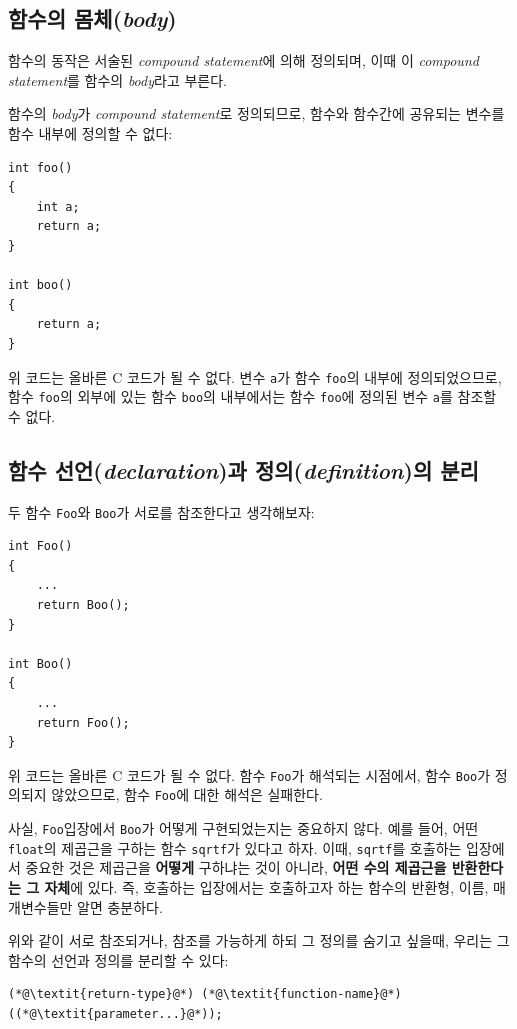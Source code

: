\documentclass[a4paper,12pt]{book}
\newcommand{\V}[1]{\Verb|#1|}
\begin{document}
\subsection{함수의 몸체(\textit{body})}

함수의 동작은 서술된 \textit{compound statement}에 의해 정의되며,
이때 이 \textit{compound statement}를 함수의 \textit{body}라고 부른다.

함수의 \textit{body}가 \textit{compound statement}로 정의되므로,
함수와 함수간에 공유되는 변수를 함수 내부에 정의할 수 없다:

\begin{lstlisting}
int foo()
{
    int a;
    return a;
}

int boo()
{
    return a;
}
\end{lstlisting}

위 코드는 올바른 C 코드가 될 수 없다.
변수 \V{a}가 함수 \V{foo}의 내부에 정의되었으므로,
함수 \V{foo}의 외부에 있는 함수 \V{boo}의 내부에서는
함수 \V{foo}에 정의된 변수 \V{a}를 참조할 수 없다.


\subsection{함수 선언(\textit{declaration})과 정의(\textit{definition})의 분리}

두 함수 \V{Foo}와 \V{Boo}가 서로를 참조한다고 생각해보자:

\begin{lstlisting}
int Foo()
{
    ...
    return Boo();
}

int Boo()
{
    ...
    return Foo();
}
\end{lstlisting}

위 코드는 올바른 C 코드가 될 수 없다.
함수 \V{Foo}가 해석되는 시점에서,
함수 \V{Boo}가 정의되지 않았으므로,
함수 \V{Foo}에 대한 해석은 실패한다.

사실, \V{Foo}입장에서 \V{Boo}가 어떻게 구현되었는지는 중요하지 않다.
예를 들어, 어떤 \V{float}의 제곱근을 구하는 함수 \V{sqrtf}가 있다고 하자.
이때, \V{sqrtf}를 호출하는 입장에서 중요한 것은
제곱근을 \textbf{어떻게} 구하냐는 것이 아니라, \textbf{어떤 수의 제곱근을 반환한다는 그 자체}에 있다.
즉, 호출하는 입장에서는 호출하고자 하는 함수의 반환형, 이름, 매개변수들만 알면 충분하다.

위와 같이 서로 참조되거나, 참조를 가능하게 하되 그 정의를 숨기고 싶을때,
우리는 그 함수의 선언과 정의를 분리할 수 있다:

\begin{lstlisting}
(*@\textit{return-type}@*) (*@\textit{function-name}@*)((*@\textit{parameter...}@*));
\end{lstlisting}
\end{document}
